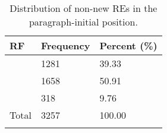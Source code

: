 \begin{table}
\begin{tabularx}{\textwidth}{lYY}
  \lsptoprule
RF  & Frequency & Percent (\%) \\ 
  \midrule
{} & 1281 & 39.33 \\ 
   & 1658 & 50.91 \\ 
   & 318 & 9.76 \vspace{0.1cm} \\ 
 \midrule
  Total & 3257 & 100.00 \\ 
   \lspbottomrule
\end{tabularx}
\caption{Distribution of non-new REs in the paragraph-initial position.} 
\label{tab:interparFirstRE}
\end{table}
